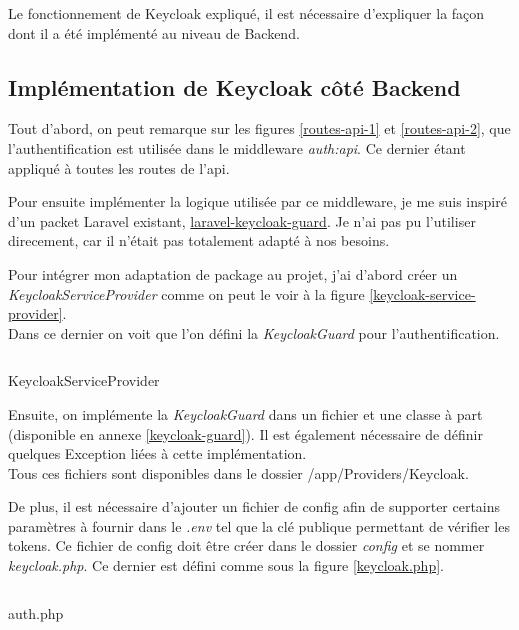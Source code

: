 \documentclass[
    iai, %
    il, %
]{heig-tb}
\begin{document}
Le fonctionnement de Keycloak expliqué, il est nécessaire d'expliquer la façon dont il a été implémenté au niveau de Backend.

\subsection{Implémentation de Keycloak côté Backend}
Tout d'abord, on peut remarque sur les figures \ref{routes-api-1} et \ref{routes-api-2}, que l'authentification est utilisée dans le middleware \emph{auth:api}. Ce dernier étant appliqué à toutes les routes de l'\Gls{api}.

Pour ensuite implémenter la logique utilisée par ce middleware, je me suis inspiré d'un packet Laravel existant, \href{https://github.com/robsontenorio/laravel-keycloak-guard}{laravel-keycloak-guard}. Je n'ai pas pu l'utiliser direcement, car il n'était pas totalement adapté à nos besoins.

Pour intégrer mon adaptation de package au projet, j'ai d'abord créer un \emph{KeycloakServiceProvider} comme on peut le voir à la figure \ref{keycloak-service-provider}. \\
Dans ce dernier on voit que l'on défini la \emph{KeycloakGuard} pour l'authentification.

\begin{listing}[h]
    \inputminted{php}{assets/code/KeycloakServiceProvider.php}
    \caption{KeycloakServiceProvider \label{keycloak-service-provider}}
\end{listing}

Ensuite, on implémente la \emph{KeycloakGuard} dans un fichier et une classe à part (disponible en annexe \ref{keycloak-guard}). Il est également nécessaire de définir quelques Exception liées à cette implémentation. \\
Tous ces fichiers sont disponibles dans le dossier /app/Providers/Keycloak.

De plus, il est nécessaire d'ajouter un fichier de config afin de supporter certains paramètres à fournir dans le \emph{.env} tel que la clé publique permettant de vérifier les tokens. Ce fichier de config doit être créer dans le dossier \emph{config} et se nommer \emph{keycloak.php}. Ce dernier est défini comme sous la figure \ref{keycloak.php}.

\begin{listing}[h]
    \inputminted{php}{assets/code/keycloak.php}
    \caption{auth.php \label{keycloak.php}}
\end{listing}
\end{document}
